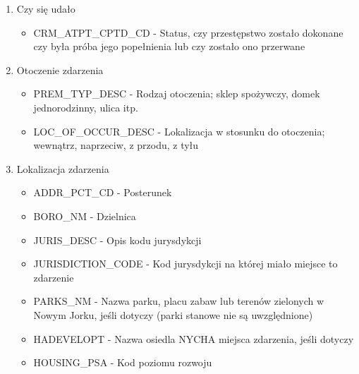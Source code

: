 \documentclass{classrep}
\begin{document}
{{\begin{enumerate}
\begin{itemize}
                    \item OFNS\_DESC - Opis wykroczenia odpowiadający kodowi klucza
                    \item PD\_CD - Trzycyfrowy kod klasyfikacji wewnętrznej (bardziej szczegółowy niż Key Code)
                    \item PD\_DESC - Opis wewnętrznej klasyfikacji odpowiadającej kodowi PD (bardziej szczegółowy niż opis przestępstwa)
                    \item LAW\_CAT\_CD - Poziom wykroczenia: przestępstwo, wykroczenie, naruszenie
                \end{itemize}
                \item Czy się udało
                \begin{itemize}
                    \item CRM\_ATPT\_CPTD\_CD - Status, czy przestępstwo zostało dokonane czy była próba jego popełnienia lub czy zostało ono przerwane
                \end{itemize}
                \item Otoczenie zdarzenia
                \begin{itemize}
                    \item PREM\_TYP\_DESC - Rodzaj otoczenia; sklep spożywczy, domek jednorodzinny, ulica itp.
                    \item LOC\_OF\_OCCUR\_DESC - Lokalizacja w stosunku do otoczenia; wewnątrz, naprzeciw, z przodu, z tyłu
                \end{itemize}
                \item Lokalizacja zdarzenia
                \begin{itemize}
                    \item ADDR\_PCT\_CD - Posterunek
                    \item BORO\_NM - Dzielnica
                    \item JURIS\_DESC - Opis kodu jurysdykcji
                    \item JURISDICTION\_CODE - Kod jurysdykcji na której miało miejsce to zdarzenie
                    \item PARKS\_NM - Nazwa parku, placu zabaw lub terenów zielonych w Nowym Jorku, jeśli dotyczy (parki stanowe nie są uwzględnione)
                    \item HADEVELOPT - Nazwa osiedla NYCHA miejsca zdarzenia, jeśli dotyczy
                    \item HOUSING\_PSA - Kod poziomu rozwoju

\end{itemize}
\end{enumerate}}}
\end{document}
